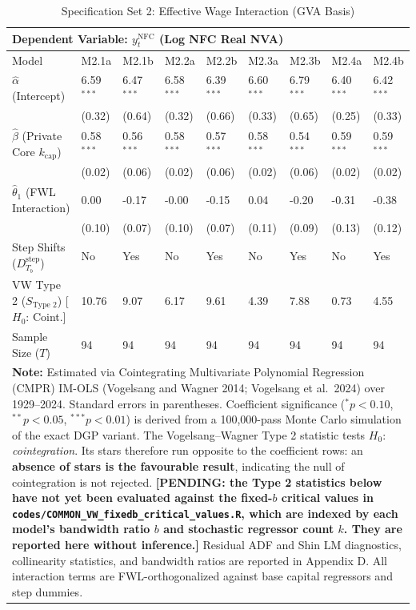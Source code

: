 \begin{table}[H]
\centering
\setlength{\tabcolsep}{2.5pt}
\caption{Specification Set 2: Effective Wage Interaction (GVA Basis)}
\label{tab:specA_set2_gva_core}
\scriptsize
\begin{tabular}{p{3.8cm}p{1.1cm}p{1.1cm}p{1.1cm}p{1.1cm}p{1.1cm}p{1.1cm}p{1.1cm}p{1.1cm}}
\toprule
\multicolumn{9}{l}{\textbf{Dependent Variable: $y_t^{\text{NFC}}$ (Log NFC Real NVA)}} \\
\midrule
Model & M2.1a & M2.1b & M2.2a & M2.2b & M2.3a & M2.3b & M2.4a & M2.4b \\
\midrule
$\hat{\alpha}$ (Intercept) & 6.59$^{***}$ & 6.47$^{***}$ & 6.58$^{***}$ & 6.39$^{***}$ & 6.60$^{***}$ & 6.79$^{***}$ & 6.40$^{***}$ & 6.42$^{***}$ \\
 & (0.32) & (0.64) & (0.32) & (0.66) & (0.33) & (0.65) & (0.25) & (0.33) \\
$\hat{\beta}$ (Private Core $k_{\text{cap}}$) & 0.58$^{***}$ & 0.56$^{***}$ & 0.58$^{***}$ & 0.57$^{***}$ & 0.58$^{***}$ & 0.54$^{***}$ & 0.59$^{***}$ & 0.59$^{***}$ \\
 & (0.02) & (0.06) & (0.02) & (0.06) & (0.02) & (0.06) & (0.02) & (0.02) \\
$\hat{\theta}_1$ (FWL Interaction) & 0.00 & -0.17 & -0.00 & -0.15 & 0.04 & -0.20 & -0.31 & -0.38 \\
 & (0.10) & (0.07) & (0.10) & (0.07) & (0.11) & (0.09) & (0.13) & (0.12) \\
Step Shifts ($D_{T_b}^{\text{step}}$) & No & Yes & No & Yes & No & Yes & No & Yes \\
\midrule
VW Type 2 ($S_{\text{Type 2}}$) [$H_0$: Coint.] & 10.76 & 9.07 & 6.17 & 9.61 & 4.39 & 7.88 & 0.73 & 4.55 \\
\midrule
Sample Size ($T$) & 94 & 94 & 94 & 94 & 94 & 94 & 94 & 94 \\
\bottomrule
\multicolumn{9}{p{14.5cm}}{\footnotesize \textbf{Note:} Estimated via Cointegrating Multivariate Polynomial Regression (CMPR) IM-OLS (Vogelsang and Wagner 2014; Vogelsang et al.\ 2024) over 1929--2024. Standard errors in parentheses. Coefficient significance ($^* p < 0.10$, $^{**} p < 0.05$, $^{***} p < 0.01$) is derived from a 100,000-pass Monte Carlo simulation of the exact DGP variant. The Vogelsang--Wagner Type 2 statistic tests $H_0$: \emph{cointegration}. Its stars therefore run opposite to the coefficient rows: an \textbf{absence of stars is the favourable result}, indicating the null of cointegration is not rejected. \textbf{[PENDING: the Type 2 statistics below have not yet been evaluated against the fixed-$b$ critical values in \texttt{codes/COMMON\_VW\_fixedb\_critical\_values.R}, which are indexed by each model's bandwidth ratio $b$ and stochastic regressor count $k$. They are reported here without inference.]} Residual ADF and Shin LM diagnostics, collinearity statistics, and bandwidth ratios are reported in Appendix D. All interaction terms are FWL-orthogonalized against base capital regressors and step dummies.} \\
\end{tabular}
\end{table}
